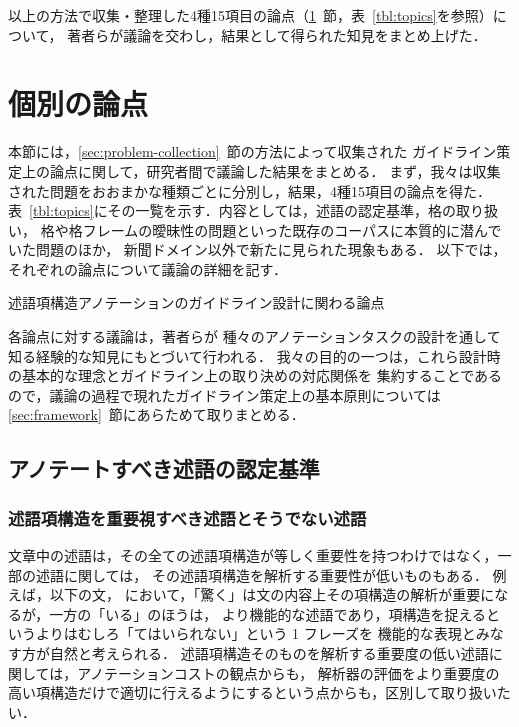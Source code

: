 \documentclass[japanese]{jnlp_1.4}
\begin{document}
以上の方法で収集・整理した4種15項目の論点（\ref{sec:individual}~節，表~\ref{tbl:topics}を参照）について，
著者らが議論を交わし，結果として得られた知見をまとめ上げた．


\section{個別の論点}
\label{sec:individual}

本節には，\ref{sec:problem-collection}~節の方法によって収集された
ガイドライン策定上の論点に関して，研究者間で議論した結果をまとめる．
まず，我々は収集された問題をおおまかな種類ごとに分別し，結果，4種15項目の論点を得た．
表~\ref{tbl:topics}にその一覧を示す．内容としては，述語の認定基準，格の取り扱い，
格や格フレームの曖昧性の問題といった既存のコーパスに本質的に潜んでいた問題のほか，
新聞ドメイン以外で新たに見られた現象もある．
以下では，それぞれの論点について議論の詳細を記す．

\begin{table}[b]
\caption{述語項構造アノテーションのガイドライン設計に関わる論点}
\label{tbl:topics}

\end{table}

各論点に対する議論は，著者らが
種々のアノテーションタスクの設計を通して知る経験的な知見にもとづいて行われる．
我々の目的の一つは，これら設計時の基本的な理念とガイドライン上の取り決めの対応関係を
集約することであるので，議論の過程で現れたガイドライン策定上の基本原則については
\ref{sec:framework}~節にあらためて取りまとめる．


\subsection{アノテートすべき述語の認定基準}
\label{sec:pred-dicision}

\subsubsection{述語項構造を重要視すべき述語とそうでない述語}
\label{sec:important-pred}

文章中の述語は，その全ての述語項構造が等しく重要性を持つわけではなく，一部の述語に関しては，
その述語項構造を解析する重要性が低いものもある．
例えば，以下の文，
において，「驚く」は文の内容上その項構造の解析が重要になるが，一方の「いる」のほうは，
より機能的な述語であり，項構造を捉えるというよりはむしろ「てはいられない」という 1 フレーズを
機能的な表現とみなす方が自然と考えられる．
述語項構造そのものを解析する重要度の低い述語に関しては，アノテーションコストの観点からも，
解析器の評価をより重要度の高い項構造だけで適切に行えるようにするという点からも，区別して取り扱いたい．
\end{document}
